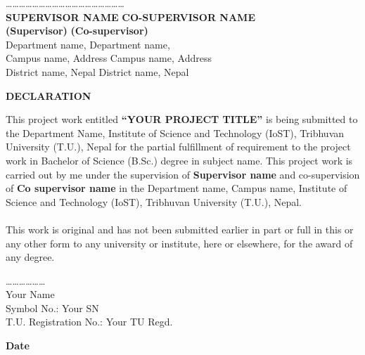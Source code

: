 \vfill \noindent
\dots\dots\dots\dots\dots\dots\dots\dots\dots \hfill \dots\dots\dots\dots\dots\dots\dots\dots\dots\\
\textbf{SUPERVISOR NAME} \hfill  \textbf{CO-SUPERVISOR NAME}\\
\textbf{(Supervisor)} \hfill  \textbf{(Co-supervisor)}\\
Department name, \hfill Department name,\\
Campus name, Address \hfill Campus name, Address\\
District name, Nepal \hfill District name, Nepal
\vfill
\newpage
{}
{}
\begin{center}
\Large\bf {DECLARATION}
\end{center}
\vspace{0.9cm} 
This project work entitled {\bf ``YOUR PROJECT TITLE''} is being submitted to the Department Name, Institute of Science and Technology (IoST), Tribhuvan University (T.U.), Nepal for the partial fulfillment of requirement to the project work in Bachelor of Science (B.Sc.) degree in subject name. This project work is carried out by me under the supervision of {\bf Supervisor name} and co-supervision of {\bf Co supervisor name} in the Department name, Campus name, Institute of Science and Technology (IoST), Tribhuvan University (T.U.), Nepal.\\
\\
This work is original and has not been submitted earlier in part or full in this or any other form to any university or institute, here or elsewhere, for the award of any degree.
\vspace{3.5cm}\noindent\\
\begin{flushright}
\dots\dots\dots\dots\dots\dots\\
Your Name\\
Symbol No.: Your SN\\
T.U. Registration No.: Your TU Regd.
\end{flushright}
\vspace{5cm}
\begin{center}
 \fontsize{14}{14} \textbf{Date}
\end{center}

